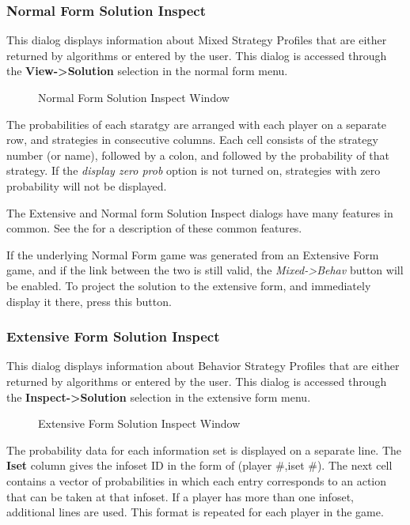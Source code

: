 \documentclass[12pt]{report}
\begin{document}
\subsubsection{Normal Form Solution Inspect}\label{NormalSolutionInspect}

This dialog displays information about Mixed Strategy Profiles that
are either returned by algorithms or entered by the user.  This dialog
is accessed through the {\bf View->Solution} selection in the normal
form menu.  

\begin{figure}
\caption{Normal Form Solution Inspect Window}\label{fig_nfgsoln}
\end{figure}

The probabilities of each staratgy are arranged with each player on a
separate row, and strategies in consecutive columns.  Each cell
consists of the strategy number (or name), followed by a colon, and
followed by the probability of that strategy.  If the {\em display
zero prob} option is not turned on, strategies with zero probability
will not be displayed.

The Extensive and Normal form Solution Inspect dialogs have many
features in common.  See the  for a description of these common features.

If the underlying Normal Form game was generated from an Extensive
Form game, and if the link between the two is still valid, the {\em
Mixed->Behav} button will be enabled.  To project the solution to the
extensive form, and immediately display it there, press this button.

\subsubsection{Extensive Form Solution Inspect}\label{ExtensiveSolutionInspect}

This dialog displays information about Behavior Strategy Profiles that
are either returned by algorithms or entered by the user.  This dialog
is accessed through the {\bf Inspect->Solution} selection in the
extensive form menu.

\begin{figure}
\caption{Extensive Form Solution Inspect Window}\label{fig_efgsoln}
\end{figure}

The probability data for each information set is displayed on a
separate line.  The {\bf Iset} column gives the infoset ID in the form
of (player \#,iset \#).  The next cell contains a vector of
probabilities in which each entry corresponds to an action that can be
taken at that infoset.  If a player has more than one infoset,
additional lines are used.  This format is repeated for each player in
the game.
\end{document}

